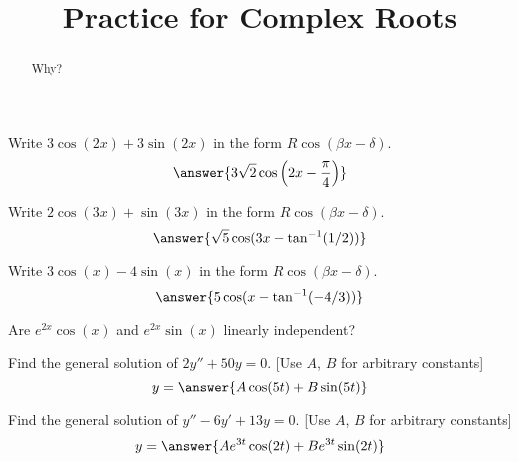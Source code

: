 \documentclass{ximera}
\title{Practice for Complex Roots}
\begin{document}
\begin{abstract}
    Why?
\end{abstract}
\maketitle



\begin{exercise}%
    Write $3 \cos(2x) + 3\sin(2x)$ in the form $R \cos(\beta x - \delta)$.
    \[
        \answer{3\sqrt{2}\cos\left(2x - \frac{\pi}{4}\right)}
    \]
\end{exercise}

\begin{exercise}
    Write $2 \cos(3x) + \sin(3x)$ in the form $R \cos(\beta x - \delta)$.
    \[
        \answer{\sqrt{5}\cos(3x - \tan^{-1}(1/2))}
    \]
\end{exercise}

\begin{exercise}
    Write $3 \cos(x) - 4\sin(x)$ in the form $R \cos(\beta x - \delta)$.
    \[
        \answer{5\cos(x - \tan^{-1}(-4/3))}
    \]
\end{exercise}

\begin{exercise}
    Are $e^{2x}\cos(x)$ and $e^{2x}\sin(x)$ linearly independent?
    \begin{multipleChoice}
    \end{multipleChoice}
\end{exercise}

\begin{exercise}
    Find the general solution of $2y'' + 50y = 0$. [Use $A$, $B$ for arbitrary constants]
    \[
        y = \answer{A\cos(5t) + B\sin(5t)}
    \]
\end{exercise}

\begin{exercise}
    Find the general solution of $y'' - 6 y' + 13 y = 0$. [Use $A$, $B$ for arbitrary constants]
    \[
        y = \answer{Ae^{3t}\cos(2t) + Be^{3t}\sin(2t)}
    \]
\end{exercise}
\end{document}
